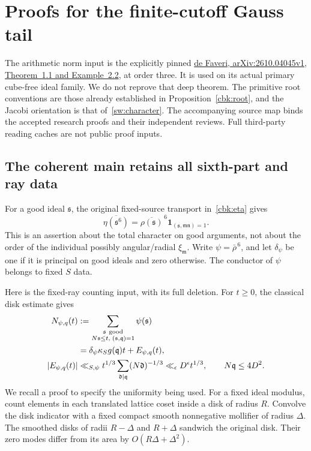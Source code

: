 \section{Proofs for the finite-cutoff Gauss tail}
\label{gtl:details}
The arithmetic norm input is the explicitly pinned
\href{https://arxiv.org/abs/2610.04045v1}{de Faveri,
arXiv:2610.04045v1, Theorem~1.1 and Example~2.2}, at order three.
It is used on its actual primary cube-free ideal family.
We do not reprove that deep theorem. The primitive root conventions
are those already established in Proposition~\ref{cbk:root}, and
the Jacobi orientation is that of~\eqref{sw:character}.
The accompanying source map binds the accepted research proofs and
their independent reviews. Full third-party reading caches are not
public proof inputs.

\subsection{The coherent main retains all sixth-part and ray data}
\label{gtl:mean-proof}
For a good ideal $\mathfrak s$, the original fixed-source transport
in~\eqref{cbk:eta} gives
\begin{equation}\label{gtl:sixth-phase}
 \overline{\eta(\mathfrak s^6)}
   =\overline{\rho(\mathfrak s)}^{\,6}
                    \mathbf1_{(\mathfrak s,\mathfrak m\mathfrak n)=1}.
\end{equation}
This is an assertion about the total character on good arguments,
not about the order of the individual possibly angular/radial
$\xi_{\mathfrak m}$. Write $\psi=\bar\rho^{\,6}$, and let
$\delta_\psi$ be one if it is principal on good ideals and zero
otherwise. The conductor of $\psi$ belongs to fixed $S$ data.

Here is the fixed-ray counting input, with its full deletion.
For $t\ge0$, the classical disk estimate gives
\begin{equation}\label{gtl:ray-count}
 \begin{aligned}
 N_{\psi,q}(t)
 &:=\sum_{\substack{\mathfrak s\ {\rm good}\\
                    N\mathfrak s\le t,\;(\mathfrak s,\mathfrak q)=1}}
                                                  \psi(\mathfrak s)\\
 &=\delta_\psi\kappa_S g(\mathfrak q)t+E_{\psi,q}(t),\\
 |E_{\psi,q}(t)|
 &\ll_{S,\psi}t^{1/3}
                  \sum_{\mathfrak d\mid\mathfrak q}(N\mathfrak d)^{-1/3}
 \ll_\epsilon D^\epsilon t^{1/3},
 \qquad N\mathfrak q\le4D^2 .
 \end{aligned}
\end{equation}
We recall a proof to specify the uniformity being used.
For a fixed ideal modulus, count elements in each translated
lattice coset inside a disk of radius $R$. Convolve the disk
indicator with a fixed compact smooth nonnegative mollifier
of radius $\Delta$. The smoothed disks of radii $R-\Delta$
and $R+\Delta$ sandwich the original disk. Their zero modes
differ from its area by $O(R\Delta+\Delta^2)$.

